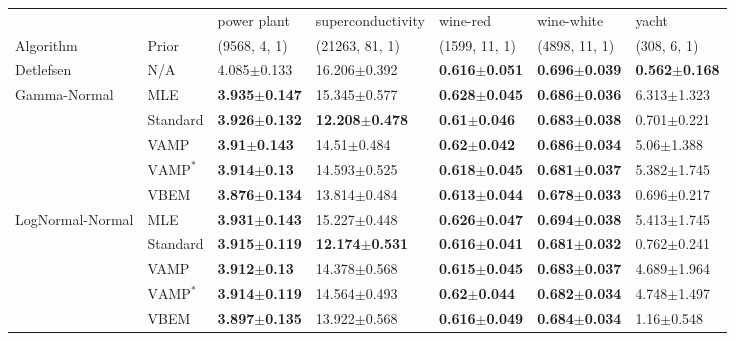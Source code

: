 \begin{tabular}{lllllll}
\midrule
                 &      &               power plant &          superconductivity &                  wine-red &                wine-white &                     yacht \\
Algorithm & Prior& (9568, 4, 1)& (21263, 81, 1)& (1599, 11, 1)& (4898, 11, 1)& (308, 6, 1)\\
\midrule
Detlefsen & N/A &           4.085$\pm$0.133 &           16.206$\pm$0.392 &  \textbf{0.616$\pm$0.051} &  \textbf{0.696$\pm$0.039} &  \textbf{0.562$\pm$0.168} \\
Gamma-Normal & MLE &  \textbf{3.935$\pm$0.147} &           15.345$\pm$0.577 &  \textbf{0.628$\pm$0.045} &  \textbf{0.686$\pm$0.036} &           6.313$\pm$1.323 \\
                 & Standard &  \textbf{3.926$\pm$0.132} &  \textbf{12.208$\pm$0.478} &   \textbf{0.61$\pm$0.046} &  \textbf{0.683$\pm$0.038} &           0.701$\pm$0.221 \\
                 & VAMP &   \textbf{3.91$\pm$0.143} &            14.51$\pm$0.484 &   \textbf{0.62$\pm$0.042} &  \textbf{0.686$\pm$0.034} &            5.06$\pm$1.388 \\
                 & $\text{VAMP}^*$ &   \textbf{3.914$\pm$0.13} &           14.593$\pm$0.525 &  \textbf{0.618$\pm$0.045} &  \textbf{0.681$\pm$0.037} &           5.382$\pm$1.745 \\
                 & VBEM &  \textbf{3.876$\pm$0.134} &           13.814$\pm$0.484 &  \textbf{0.613$\pm$0.044} &  \textbf{0.678$\pm$0.033} &           0.696$\pm$0.217 \\
LogNormal-Normal & MLE &  \textbf{3.931$\pm$0.143} &           15.227$\pm$0.448 &  \textbf{0.626$\pm$0.047} &  \textbf{0.694$\pm$0.038} &           5.413$\pm$1.745 \\
                 & Standard &  \textbf{3.915$\pm$0.119} &  \textbf{12.174$\pm$0.531} &  \textbf{0.616$\pm$0.041} &  \textbf{0.681$\pm$0.032} &           0.762$\pm$0.241 \\
                 & VAMP &   \textbf{3.912$\pm$0.13} &           14.378$\pm$0.568 &  \textbf{0.615$\pm$0.045} &  \textbf{0.683$\pm$0.037} &           4.689$\pm$1.964 \\
                 & $\text{VAMP}^*$ &  \textbf{3.914$\pm$0.119} &           14.564$\pm$0.493 &   \textbf{0.62$\pm$0.044} &  \textbf{0.682$\pm$0.034} &           4.748$\pm$1.497 \\
                 & VBEM &  \textbf{3.897$\pm$0.135} &           13.922$\pm$0.568 &  \textbf{0.616$\pm$0.049} &  \textbf{0.684$\pm$0.034} &            1.16$\pm$0.548 \\
\bottomrule
\end{tabular}

